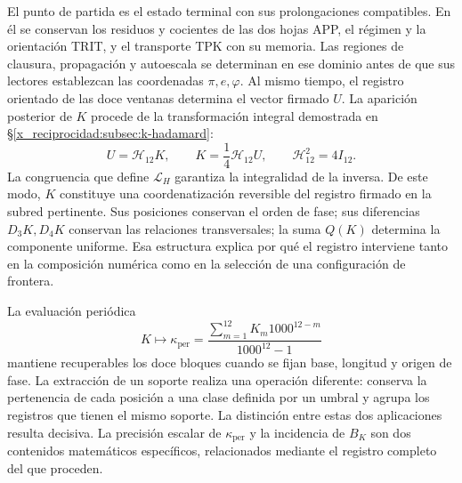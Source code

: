 El punto de partida es el estado terminal con sus prolongaciones
compatibles. En él se conservan los residuos y cocientes de las dos hojas
APP, el régimen y la orientación TRIT, y el transporte TPK con su memoria.
Las regiones de clausura, propagación y autoescala se determinan en ese
dominio antes de que sus lectores establezcan las coordenadas
$\pi,e,\varphi$. Al mismo tiempo, el registro orientado de las doce
ventanas determina el vector firmado $U$. La aparición posterior de $K$
procede de la transformación integral demostrada en
\S\ref{x_reciprocidad:subsec:k-hadamard}:
\begin{equation}
 U=\mathcal H_{12}K,\qquad
 K=\frac14\mathcal H_{12}U,\qquad
 \mathcal H_{12}^{2}=4I_{12}.
 \label{x_reciprocidad:inc-ampl-registro}
\end{equation}
La congruencia que define $\mathcal L_H$ garantiza la integralidad de
la inversa. De este modo, $K$ constituye una coordenatización reversible
del registro firmado en la subred pertinente. Sus posiciones conservan el
orden de fase; sus diferencias $D_3K,D_4K$ conservan las relaciones
transversales; la suma $Q(K)$ determina la componente uniforme. Esa
estructura explica por qué el registro interviene tanto en la composición
numérica como en la selección de una configuración de frontera.

La evaluación periódica
\[
 K\longmapsto\kappa_{\mathrm{per}}
 =\frac{\sum_{m=1}^{12}K_m1000^{12-m}}{1000^{12}-1}
\]
mantiene recuperables los doce bloques cuando se fijan base, longitud y
origen de fase. La extracción de un soporte realiza una operación
diferente: conserva la pertenencia de cada posición a una clase definida
por un umbral y agrupa los registros que tienen el mismo soporte. La
distinción entre estas dos aplicaciones resulta decisiva. La precisión
escalar de $\kappa_{\mathrm{per}}$ y la incidencia de $B_K$ son dos
contenidos matemáticos específicos, relacionados mediante el registro
completo del que proceden.




